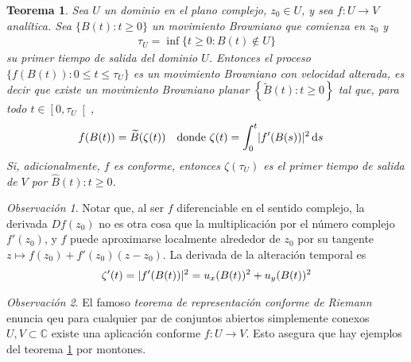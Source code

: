 \documentclass{article}
\newcommand{\brownian}{B}
\newcommand{\alteredBrownian}{\widetilde{\brownian}}
\newcommand{\dd}{\mathop{}\!\mathrm{d}}
\newcommand{\complexNumbers}{\mathbb{C}}
\DeclarePairedDelimiter{\abs}{\lvert}{\rvert}
\theoremstyle{plain}
\newtheorem{theorem}{Teorema}
\theoremstyle{remark}
\newtheorem{remark}{Observación}
\theoremstyle{definition}
\begin{document}
\begin{theorem}
  \label{theorem:ConformalInvarianceOfPlanarBrownianMotion}
  Sea \(U\) un dominio en el plano complejo, \(z_0 \in U\), y sea \(f : U \rightarrow V\) analítica.
  Sea \(\{\brownian(t) : t \geq 0\}\) un movimiento Browniano que comienza en \(z_0\) y
  \begin{align}
    \tau_U
    =
    \inf \{ t \geq 0 : \brownian(t) \notin U\}
  \end{align}
  su primer tiempo de salida del dominio \(U\).
  Entonces el proceso
  \(\{f(\brownian(t)) : 0 \leq t \leq \tau_U\}\)  %
  es un movimiento Browniano con velocidad alterada, es decir que existe un movimiento Browniano planar \(\left\{ \alteredBrownian(t) : t \geq 0 \right\}\) tal que, para todo \(t \in \left[ 0, \tau_U \right[\),
  \begin{align}
    & f(\brownian(t)) = \alteredBrownian(\zeta(t))
    &
    & \text{donde }
    \zeta(t) = \int_0^t \abs{f'(\brownian(s))}^2 \dd s
  \end{align}
  Si, adicionalmente, \(f\) es conforme, entonces \(\zeta(\tau_U)\) es el primer tiempo de salida de \(V\) por \(\widehat{B}(t) : t \geq 0\).
\end{theorem}
\begin{remark}
  Notar que, al ser \(f\) diferenciable en el sentido complejo, la derivada \(Df(z_0)\) no es otra cosa que la multiplicación por el número complejo \(f'(z_0)\), y \(f\) puede aproximarse localmente alrededor de \(z_0\) por su tangente \(z \mapsto f(z_0) + f'(z_0)(z - z_0)\).
  La derivada de la alteración temporal es
  \begin{align}
    \zeta'(t)
    =
    \abs{f'(\brownian(t))}^2
    =
    u_x(\brownian(t))^2 + u_y(\brownian(t))^2
  \end{align}
\end{remark}
\begin{remark}
  El famoso \emph{teorema de representación conforme de Riemann} enuncia qeu para cualquier par de conjuntos abiertos simplemente conexos \(U, V \subset \complexNumbers\) existe una aplicación conforme \(f : U \rightarrow V\).
  Esto asegura que hay ejemplos del teorema \ref{theorem:ConformalInvarianceOfPlanarBrownianMotion} por montones.
\end{remark}
\end{document}
